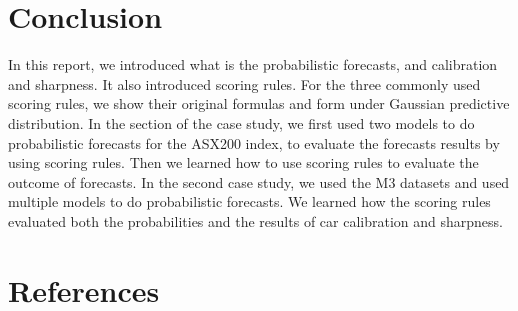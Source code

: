 \documentclass{monashthesis}
\theoremstyle{definition}
\theoremstyle{definition}
\theoremstyle{definition}
\theoremstyle{remark}
\begin{document}
\chapter{Conclusion}\label{conclusion}

In this report, we introduced what is the probabilistic forecasts, and
calibration and sharpness. It also introduced scoring rules. For the
three commonly used scoring rules, we show their original formulas and
form under Gaussian predictive distribution. In the section of the case
study, we first used two models to do probabilistic forecasts for the
ASX200 index, to evaluate the forecasts results by using scoring rules.
Then we learned how to use scoring rules to evaluate the outcome of
forecasts. In the second case study, we used the M3 datasets and used
multiple models to do probabilistic forecasts. We learned how the
scoring rules evaluated both the probabilities and the results of car
calibration and sharpness.

\chapter{References}\label{references}
\end{document}
